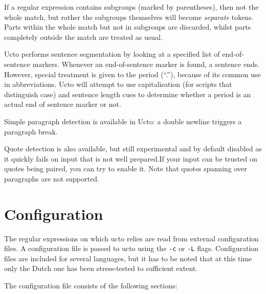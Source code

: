 \documentclass[a4paper,12pt]{report}
\begin{document}
If a regular expression contains subgroups (marked by parentheses), then not the whole match, but rather the subgroups themselves will become \emph{separate} tokens. Parts within the whole match but not in subgroups are discarded, whilst parts completely outside the match are treated as usual.

Ucto performs sentence segmentation by looking at a specified list of end-of-sentence markers. Whenever an end-of-sentence marker is found, a sentence ends. However, special treatment is given to the period (``.''), because of its common use in abbreviations. Ucto will attempt to use capitalisation (for scripts that distinguish case) and sentence length cues to determine whether a period is an actual end of sentence marker or not.

Simple paragraph detection is available in Ucto: a double newline triggers a paragraph break.

Quote detection is also available, but still experimental and by default disabled as it quickly fails on input that is not well prepared.If your input can be trusted on quotes being paired, you can try to enable it.  Note that quotes spanning over paragraphs are not supported.   

\section{Configuration}

The regular expressions on which ucto relies are read from external configuration files. A configuration file is passed to ucto using the \texttt{-c} or \texttt{-L} flags. Configuration files are included for several languages, but it has to be noted that at this time only the Dutch one has been stress-tested to sufficient extent.   

The configuration file consists of the following sections:
\end{document}
